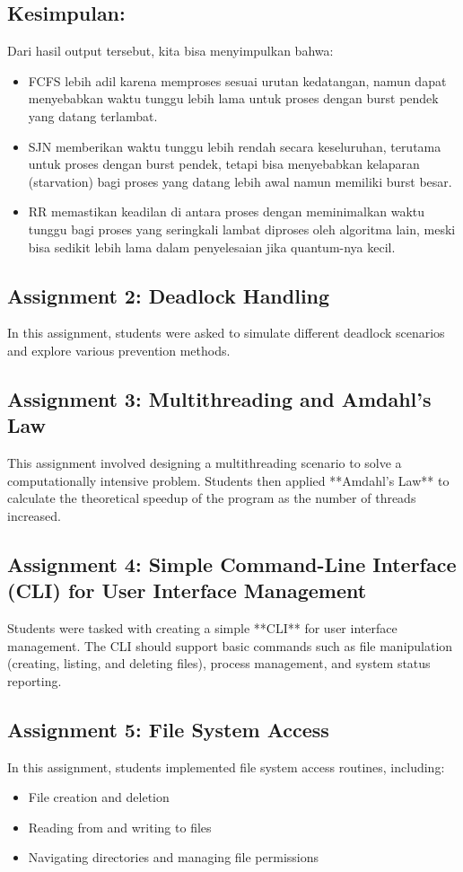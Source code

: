 \documentclass[12pt]{article}
\begin{document}
\subsection*{Kesimpulan:}
Dari hasil output tersebut, kita bisa menyimpulkan bahwa:

\begin{itemize}
    \item FCFS lebih adil karena memproses sesuai urutan kedatangan, namun dapat menyebabkan waktu tunggu lebih lama untuk proses dengan burst pendek yang datang terlambat.
    \item SJN memberikan waktu tunggu lebih rendah secara keseluruhan, terutama untuk proses dengan burst pendek, tetapi bisa menyebabkan kelaparan (starvation) bagi proses yang datang lebih awal namun memiliki burst besar.
    \item RR memastikan keadilan di antara proses dengan meminimalkan waktu tunggu bagi proses yang seringkali lambat diproses oleh algoritma lain, meski bisa sedikit lebih lama dalam penyelesaian jika quantum-nya kecil.
\end{itemize}

\subsection{Assignment 2: Deadlock Handling}
In this assignment, students were asked to simulate different deadlock scenarios and explore various prevention methods.

\subsection{Assignment 3: Multithreading and Amdahl's Law}
This assignment involved designing a multithreading scenario to solve a computationally intensive problem. Students then applied **Amdahl's Law** to calculate the theoretical speedup of the program as the number of threads increased.

\subsection{Assignment 4: Simple Command-Line Interface (CLI) for User Interface Management}
Students were tasked with creating a simple **CLI** for user interface management. The CLI should support basic commands such as file manipulation (creating, listing, and deleting files), process management, and system status reporting.

\subsection{Assignment 5: File System Access}
In this assignment, students implemented file system access routines, including:
\begin{itemize}
    \item File creation and deletion
    \item Reading from and writing to files
    \item Navigating directories and managing file permissions
\end{itemize}
\end{document}
